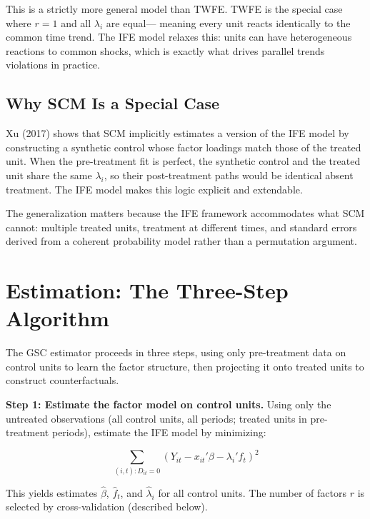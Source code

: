 \documentclass[12pt]{article}
\begin{document}
This is a strictly more general model than TWFE.
TWFE is the special case where $r = 1$ and all $\lambda_i$ are equal---
meaning every unit reacts identically to the common time trend.
The IFE model relaxes this: units can have heterogeneous reactions to common shocks,
which is exactly what drives parallel trends violations in practice.

\subsection{Why SCM Is a Special Case}

Xu (2017) shows that SCM implicitly estimates a version of the IFE model
by constructing a synthetic control whose factor loadings match those of the treated unit.
When the pre-treatment fit is perfect, the synthetic control and the treated unit
share the same $\lambda_i$, so their post-treatment paths would be identical
absent treatment. The IFE model makes this logic explicit and extendable.

The generalization matters because the IFE framework accommodates what SCM cannot:
multiple treated units, treatment at different times, and standard errors derived
from a coherent probability model rather than a permutation argument.

\section{Estimation: The Three-Step Algorithm}

The GSC estimator proceeds in three steps, using only pre-treatment data on
control units to learn the factor structure, then projecting it onto treated units
to construct counterfactuals.

\textbf{Step 1: Estimate the factor model on control units.}
Using only the untreated observations (all control units, all periods;
treated units in pre-treatment periods), estimate the IFE model by minimizing:

\begin{equation}
  \sum_{(i,t): D_{it}=0} \left( Y_{it} - x_{it}'\beta - \lambda_i' f_t \right)^2
\end{equation}

This yields estimates $\hat{\beta}$, $\hat{f}_t$, and $\hat{\lambda}_i$
for all control units. The number of factors $r$ is selected by cross-validation
(described below).
\end{document}
